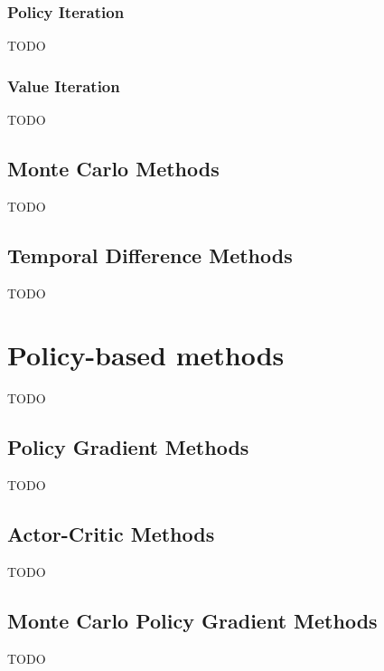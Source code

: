 \documentclass[../chapters.tex]{subfiles}
\begin{document}
    \subsubsection{Policy Iteration}\label{subsubsec:policy-iteration}
    TODO

    \subsubsection{Value Iteration}\label{subsubsec:value-iteration}
    TODO

    \subsection{Monte Carlo Methods}\label{subsec:monte-carlo-methods}
    TODO

    \subsection{Temporal Difference Methods}\label{subsec:temporal-difference-methods}
    TODO



    \section{Policy-based methods}
    TODO

    \subsection{Policy Gradient Methods}\label{subsec:policy-gradient-methods}
    TODO

    \subsection{Actor-Critic Methods}\label{subsec:actor-critic-methods}
    TODO

    \subsection{Monte Carlo Policy Gradient Methods}\label{subsec:monte-carlo-policy-gradient-methods}
    TODO
\end{document}

